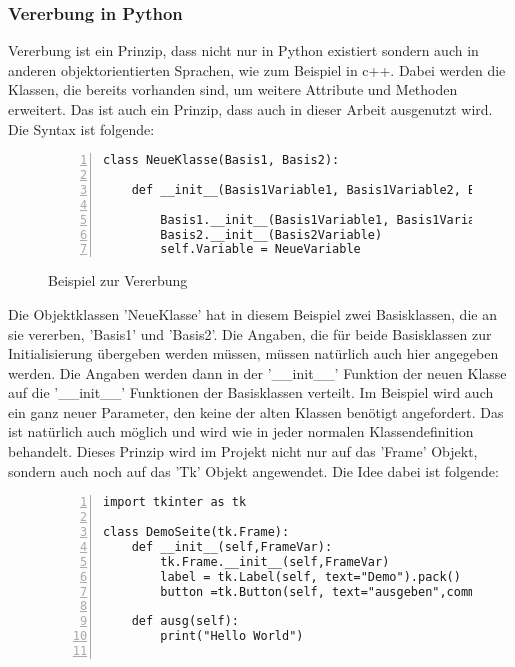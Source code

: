 \documentclass[11pt]{scrartcl}
\begin{document}
\begin{onehalfspace}
\subsubsection{Vererbung in Python}
Vererbung ist ein Prinzip, dass nicht nur in Python existiert sondern auch in anderen objektorientierten Sprachen, wie zum Beispiel in c++. Dabei werden die Klassen, die bereits vorhanden sind, um weitere Attribute und Methoden erweitert.  Das ist auch ein Prinzip, dass auch in dieser Arbeit ausgenutzt wird. Die Syntax ist folgende: 

\begin{figure}[H]
\begin{lstlisting}[basicstyle=\small,numbers=left, stepnumber=1]
class NeueKlasse(Basis1, Basis2):

    def __init__(Basis1Variable1, Basis1Variable2, Basis2Variable, NeueVariable):

        Basis1.__init__(Basis1Variable1, Basis1Variable2)
        Basis2.__init__(Basis2Variable)
        self.Variable = NeueVariable
\end{lstlisting}
\caption{Beispiel zur Vererbung}
\label{code:vererbung}
\end{figure}

 Die Objektklassen 'NeueKlasse' hat in diesem Beispiel zwei Basisklassen, die an sie vererben, 'Basis1' und 'Basis2'. Die Angaben, die für beide Basisklassen zur Initialisierung übergeben werden müssen, müssen natürlich auch hier angegeben werden. Die Angaben werden dann in der '\_\_init\_\_' Funktion der neuen Klasse auf die '\_\_init\_\_' Funktionen der Basisklassen verteilt. Im Beispiel wird auch ein ganz neuer Parameter, den keine der alten Klassen benötigt angefordert. Das ist natürlich auch möglich und wird wie in jeder normalen Klassendefinition behandelt. Dieses Prinzip wird im Projekt nicht nur auf das 'Frame' Objekt, sondern auch noch auf das 'Tk' Objekt angewendet. Die Idee dabei ist folgende:

\begin{figure}[H]
\begin{lstlisting}[basicstyle=\small,numbers=left,stepnumber=1]
import tkinter as tk

class DemoSeite(tk.Frame):
    def __init__(self,FrameVar):
        tk.Frame.__init__(self,FrameVar)
        label = tk.Label(self, text="Demo").pack()
        button =tk.Button(self, text="ausgeben",command=lambda :self.ausg()).pack()

    def ausg(self):
        print("Hello World")


\end{lstlisting}
\end{figure}
\end{onehalfspace}
\end{document}
